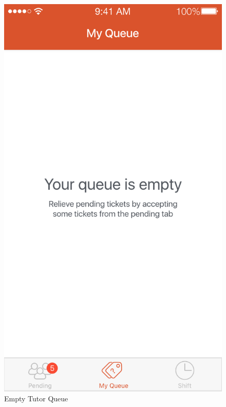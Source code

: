 \documentclass[a4paper,12pt]{article}
\begin{document}
\begin{figure}[p]
\centering
\includegraphics[scale=0.5]{4b296a8a4e.png}
\caption{Empty Tutor Queue}
\label{3}
\end{figure}
\end{document}
